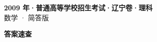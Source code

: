 \documentclass[zihao=-4, a4paper]{ctexart}
\begin{document}
\begin{center}
  {\Large\bfseries 2009 年·普通高等学校招生考试·辽宁卷·理科}\\[4pt]
  {\large 数学 · 简答版}
\end{center}
\medskip
{}

\clearpage
{}
\begin{center}{\Large\bfseries 答案速查}\end{center}
\medskip

\end{document}
